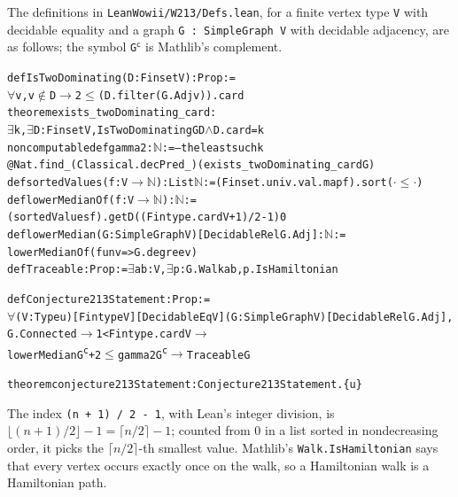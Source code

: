 \documentclass[11pt,a4paper]{article}
\theoremstyle{remark}
\newcommand{\ceil}[1]{\lceil #1\rceil}
\newcommand{\flr}[1]{\lfloor #1\rfloor}
\begin{document}
The definitions in \texttt{LeanWowii/W213/Defs.lean}, for a finite vertex type \texttt{V} with
decidable equality and a graph \texttt{G : SimpleGraph V} with decidable adjacency, are as
follows; the symbol \texttt{G}$^{\mathsf c}$ is Mathlib's complement.
\begin{alltt}\small
def IsTwoDominating (D : Finset V) : Prop :=
  \(\forall\) v, v \(\notin\) D \(\to\) 2 \(\le\) (D.filter (G.Adj v)).card
theorem exists_twoDominating_card :
  \(\exists\) k, \(\exists\) D : Finset V, IsTwoDominating G D \(\wedge\) D.card = k
noncomputable def gamma2 : \(\mathbb{N}\) :=      -- the least such k
  @Nat.find _ (Classical.decPred _) (exists_twoDominating_card G)
def sortedValues (f : V \(\to\) \(\mathbb{N}\)) : List \(\mathbb{N}\) := (Finset.univ.val.map f).sort (\(\cdot\) \(\le\) \(\cdot\))
def lowerMedianOf (f : V \(\to\) \(\mathbb{N}\)) : \(\mathbb{N}\) :=
  (sortedValues f).getD ((Fintype.card V + 1) / 2 - 1) 0
def lowerMedian (G : SimpleGraph V) [DecidableRel G.Adj] : \(\mathbb{N}\) :=
  lowerMedianOf (fun v => G.degree v)
def Traceable : Prop := \(\exists\) a b : V, \(\exists\) p : G.Walk a b, p.IsHamiltonian

def Conjecture213Statement : Prop :=
  \(\forall\) (V : Type u) [Fintype V] [DecidableEq V] (G : SimpleGraph V) [DecidableRel G.Adj],
    G.Connected \(\to\) 1 < Fintype.card V \(\to\)
    lowerMedian G\textsuperscript{c} + 2 \(\le\) gamma2 G\textsuperscript{c} \(\to\) Traceable G

theorem conjecture213Statement : Conjecture213Statement.\{u\}
\end{alltt}
The index \texttt{(n + 1) / 2 - 1}, with Lean's integer division, is
$\flr{(n+1)/2}-1=\ceil{n/2}-1$; counted from $0$ in a list sorted in nondecreasing order, it
picks the $\ceil{n/2}$-th smallest value. Mathlib's \texttt{Walk.IsHamiltonian} says that every vertex
occurs exactly once on the walk, so a Hamiltonian walk is a Hamiltonian path.
\end{document}
